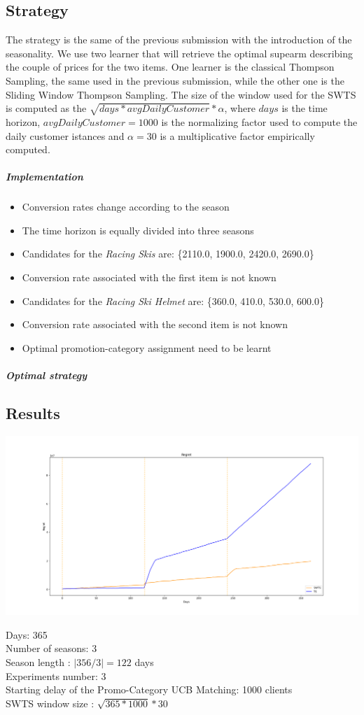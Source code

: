 \subsection*{Strategy}
The strategy is the same of the previous submission with the introduction of the seasonality. We use two learner that will retrieve the optimal supearm describing the couple of prices for the two items. One learner is the classical Thompson Sampling, the same used in the previous submission, while the other one is the Sliding Window Thompson Sampling. The size of the window used for the SWTS is computed as the $\sqrt{days * avgDailyCustomer} * \alpha$, where $days$ is the time horizon, $avgDailyCustomer = 1000$ is the normalizing factor used to compute the daily customer istances and $\alpha = 30 $ is a multiplicative factor empirically computed.

\subparagraph{Implementation} 
\begin{itemize}
	\item Conversion rates change according to the season
	\item The time horizon is equally divided into three seasons
	\item Candidates for the \textit{Racing Skis} are: \{2110.0, 1900.0, 2420.0, 2690.0\}
	\item Conversion rate associated with the first item is not known
	\item Candidates for the \textit{Racing Ski Helmet} are: \{360.0, 410.0, 530.0, 600.0\}
	\item Conversion rate associated with the second item is not known
	\item Optimal promotion-category assignment need to be learnt
\end{itemize}
\subparagraph{Optimal strategy}


\subsection*{Results}
\begin{center}
	\includegraphics[scale=0.30]{Images/n7}
\end{center}
Days: 365\\
Number of seasons: 3 \\
Season length : $|356/3| = 122 $ days\\
Experiments number: 3 \\
Starting delay of the Promo-Category UCB Matching: 1000 clients\\
SWTS window size : $\sqrt{365 * 1000} * 30$\\
